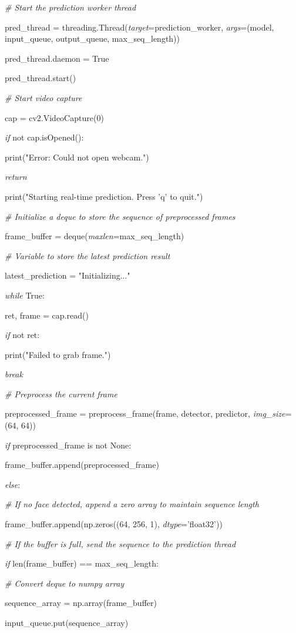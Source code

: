 \documentclass[
]{article}
\begin{document}
\emph{\# Start the prediction worker thread}

pred\_thread = threading.Thread(\emph{target}=prediction\_worker, \emph{args}=(model, input\_queue, output\_queue, max\_seq\_length))

pred\_thread.daemon = True

pred\_thread.start()

\emph{\# Start video capture}

cap = cv2.VideoCapture(0)

\emph{if} not cap.isOpened():

print("Error: Could not open webcam.")

\emph{return}

print("Starting real-time prediction. Press 'q' to quit.")

\emph{\# Initialize a deque to store the sequence of preprocessed frames}

frame\_buffer = deque(\emph{maxlen}=max\_seq\_length)

\emph{\# Variable to store the latest prediction result}

latest\_prediction = "Initializing..."

\emph{while} True:

ret, frame = cap.read()

\emph{if} not ret:

print("Failed to grab frame.")

\emph{break}

\emph{\# Preprocess the current frame}

preprocessed\_frame = preprocess\_frame(frame, detector, predictor, \emph{img\_size}=(64, 64))

\emph{if} preprocessed\_frame is not None:

frame\_buffer.append(preprocessed\_frame)

\emph{else}:

\emph{\# If no face detected, append a zero array to maintain sequence length}

frame\_buffer.append(np.zeros((64, 256, 1), \emph{dtype}='float32'))

\emph{\# If the buffer is full, send the sequence to the prediction thread}

\emph{if} len(frame\_buffer) == max\_seq\_length:

\emph{\# Convert deque to numpy array}

sequence\_array = np.array(frame\_buffer)

input\_queue.put(sequence\_array)
\end{document}
